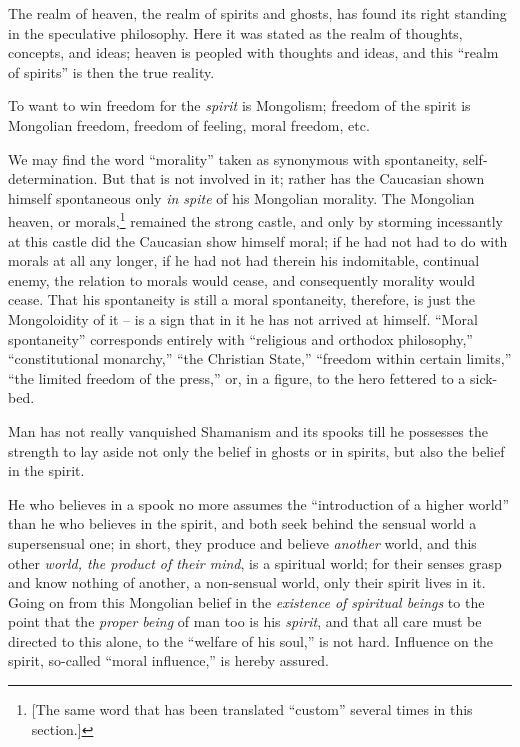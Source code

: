 The realm of heaven, the realm of spirits and ghosts, has found its right 
standing in the speculative philosophy. Here it was stated as the realm of 
thoughts, concepts, and ideas; heaven is peopled with thoughts and ideas, and 
this ``realm of spirits'' is then the true reality.

To want to win freedom for the \textit{spirit} is Mongolism; freedom of the 
spirit is Mongolian freedom, freedom of feeling, moral freedom, etc.

We may find the word ``morality'' taken as synonymous with spontaneity, 
self-determination. But that is not involved in it; rather has the Caucasian 
shown himself spontaneous only \textit{in spite} of his Mongolian morality. 
The Mongolian heaven, or morals,\footnote{[The same word that has been 
translated ``custom'' several times in this section.]} remained the strong 
castle, and only by storming incessantly at this castle did the Caucasian show 
himself moral; if he had not had to do with morals at all any longer, if he 
had not had therein his indomitable, continual enemy, the relation to morals 
would cease, and consequently morality would cease. That his spontaneity is 
still a moral spontaneity, therefore, is just the Mongoloidity of it -- is a 
sign that in it he has not arrived at himself. ``Moral spontaneity'' 
corresponds entirely with ``religious and orthodox philosophy,'' 
``constitutional monarchy,'' ``the Christian State,'' ``freedom within 
certain limits,'' ``the limited freedom of the press,'' or, in a figure, to 
the hero fettered to a sick-bed.

Man has not really vanquished Shamanism and its spooks till he possesses the 
strength to lay aside not only the belief in ghosts or in spirits, but also 
the belief in the spirit.

He who believes in a spook no more assumes the ``introduction of a higher 
world'' than he who believes in the spirit, and both seek behind the sensual 
world a supersensual one; in short, they produce and believe \textit{another} 
world, and this other \textit{world, the product of their mind}, is a 
spiritual world; for their senses grasp and know nothing of another, a 
non-sensual world, only their spirit lives in it. Going on from this Mongolian 
belief in the \textit{existence of spiritual beings} to the point that the 
\textit{proper being} of man too is his \textit{spirit}, and that all care 
must be directed to this alone, to the ``welfare of his soul,'' is not hard. 
Influence on the spirit, so-called ``moral influence,'' is hereby assured.

